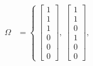 \documentclass[11pt]{article}\usepackage[]{graphicx}\usepackage[]{color}
\theoremstyle{newstyle}
\begin{document}
\begin{align*}
\Omega & = \left\{ \ \begin{bmatrix} 1 \\ 1 \\ 1 \\ 0 \\ 0 \\ 0 \end{bmatrix}, \  \begin{bmatrix} 1 \\ 1 \\ 0 \\ 1 \\ 0 \\ 0 \end{bmatrix}, \
\end{align*}
\end{document}

